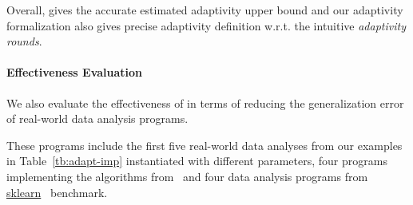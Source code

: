 Overall, {\THESYSTEM} gives the accurate estimated
adaptivity upper bound and our adaptivity formalization also gives precise adaptivity definition w.r.t. the intuitive \emph{adaptivity rounds}.


\paragraph{Effectiveness Evaluation}

We also evaluate the effectiveness of {\THESYSTEM} in terms of reducing the generalization error of real-world data analysis programs.

These programs include 
the first five real-world data analyses from our examples in Table~\ref{tb:adapt-imp} instantiated with different parameters,
four programs implementing the algorithms from~\cite{Jamieson2015TheAO}
and four data analysis programs 
from \hyperlink{https://github.com/scikit-learn/scikit-learn/tree/main/examples}{sklearn}~\cite{SklearnBenchmark} benchmark.

